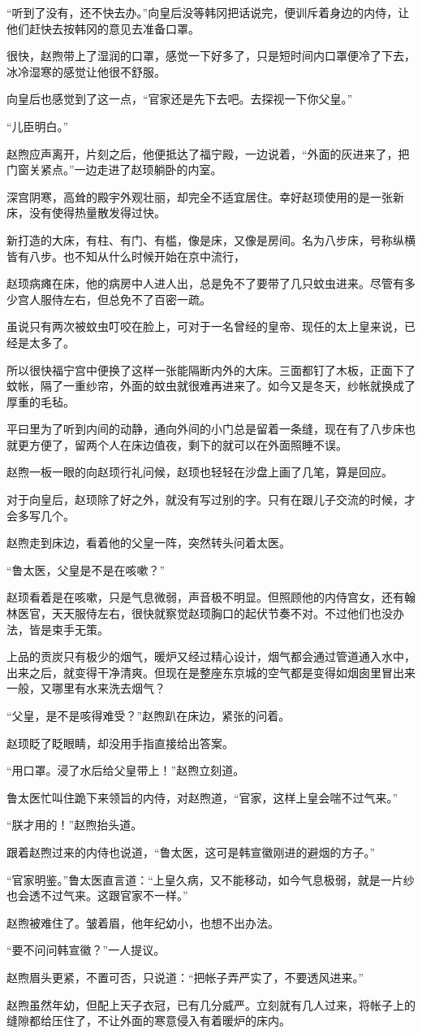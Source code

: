 “听到了没有，还不快去办。”向皇后没等韩冈把话说完，便训斥着身边的内侍，让他们赶快去按韩冈的意见去准备口罩。

很快，赵煦带上了湿润的口罩，感觉一下好多了，只是短时间内口罩便冷了下去，冰冷湿寒的感觉让他很不舒服。

向皇后也感觉到了这一点，“官家还是先下去吧。去探视一下你父皇。”

“儿臣明白。”

赵煦应声离开，片刻之后，他便抵达了福宁殿，一边说着，“外面的灰进来了，把门窗关紧点。”一边走进了赵顼躺卧的内室。

深宫阴寒，高耸的殿宇外观壮丽，却完全不适宜居住。幸好赵顼使用的是一张新床，没有使得热量散发得过快。

新打造的大床，有柱、有门、有槛，像是床，又像是房间。名为八步床，号称纵横皆有八步。也不知从什么时候开始在京中流行，

赵顼病瘫在床，他的病房中人进人出，总是免不了要带了几只蚊虫进来。尽管有多少宫人服侍左右，但总免不了百密一疏。

虽说只有两次被蚊虫叮咬在脸上，可对于一名曾经的皇帝、现任的太上皇来说，已经是太多了。

所以很快福宁宫中便换了这样一张能隔断内外的大床。三面都钉了木板，正面下了蚊帐，隔了一重纱帘，外面的蚊虫就很难再进来了。如今又是冬天，纱帐就换成了厚重的毛毡。

平曰里为了听到内间的动静，通向外间的小门总是留着一条缝，现在有了八步床也就更方便了，留两个人在床边值夜，剩下的就可以在外面照睡不误。

赵煦一板一眼的向赵顼行礼问候，赵顼也轻轻在沙盘上画了几笔，算是回应。

对于向皇后，赵顼除了好之外，就没有写过别的字。只有在跟儿子交流的时候，才会多写几个。

赵煦走到床边，看着他的父皇一阵，突然转头问着太医。

“鲁太医，父皇是不是在咳嗽？”

赵顼看着是在咳嗽，只是气息微弱，声音极不明显。但照顾他的内侍宫女，还有翰林医官，天天服侍左右，很快就察觉赵顼胸口的起伏节奏不对。不过他们也没办法，皆是束手无策。

上品的贡炭只有极少的烟气，暖炉又经过精心设计，烟气都会通过管道通入水中，出来之后，就变得干净清爽。但现在是整座东京城的空气都是变得如烟囱里冒出来一般，又哪里有水来洗去烟气？

“父皇，是不是咳得难受？”赵煦趴在床边，紧张的问着。

赵顼眨了眨眼睛，却没用手指直接给出答案。

“用口罩。浸了水后给父皇带上！”赵煦立刻道。

鲁太医忙叫住跪下来领旨的内侍，对赵煦道，“官家，这样上皇会喘不过气来。”

“朕才用的！”赵煦抬头道。

跟着赵煦过来的内侍也说道，“鲁太医，这可是韩宣徽刚进的避烟的方子。”

“官家明鉴。”鲁太医直言道：“上皇久病，又不能移动，如今气息极弱，就是一片纱也会透不过气来。这跟官家不一样。”

赵煦被难住了。皱着眉，他年纪幼小，也想不出办法。

“要不问问韩宣徽？”一人提议。

赵煦眉头更紧，不置可否，只说道：“把帐子弄严实了，不要透风进来。”

赵煦虽然年幼，但配上天子衣冠，已有几分威严。立刻就有几人过来，将帐子上的缝隙都给压住了，不让外面的寒意侵入有着暖炉的床内。
